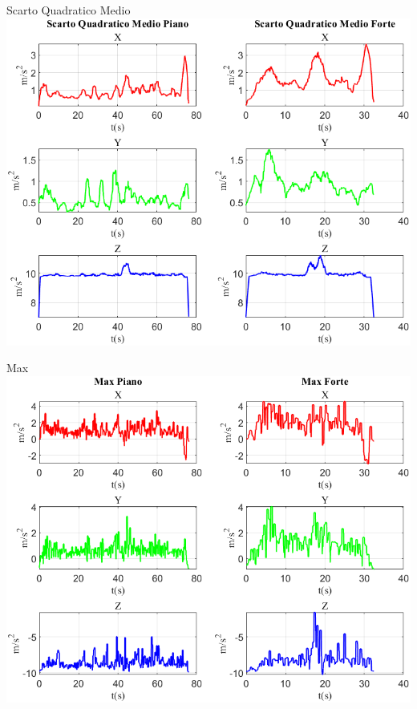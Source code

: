 	\begin{frame}{{Scarto Quadratico Medio}}
		\centering\includegraphics[height=.8\textheight]{figure/Acc/Scarto Quadratico Medio}
	\end{frame}
	
	\begin{frame}{{Max}}
		\centering\includegraphics[height=.8\textheight]{figure/Acc/Max}
	\end{frame}
	
